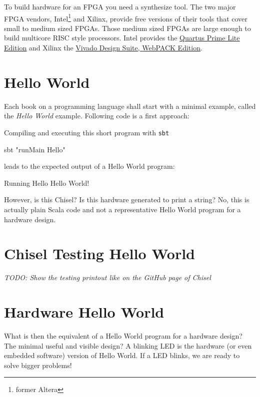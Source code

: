 \documentclass[%
    11pt, %
    headinclude, footexclude,
    openright, %
    notitlepage,
    cleardoubleempty,
    headsepline,
    pointlessnumbers,
    bibtotoc, idxtotoc,
    ]{scrbook}
\newcommand{\code}[1]{{\small{\texttt{#1}}}}
\newcommand{\todo}[1]{{\emph{TODO: #1}}}
\begin{document}
To build hardware for an FPGA you need a synthesize tool. The two major
FPGA vendors, Intel\footnote{former Altera} and Xilinx, provide free versions of
their tools that cover small to medium sized FPGAs. Those medium sized
FPGAs are large enough to build multicore RISC style processors.
Intel provides the \href{https://www.altera.com/products/design-software/fpga-design/quartus-prime/download.html}{Quartus Prime Lite Edition} and Xilinx the
\href{https://www.xilinx.com/products/design-tools/vivado/vivado-webpack.html}{Vivado Design Suite, WebPACK Edition}.

\section{Hello World}

Each book on a programming language shall start with a minimal example,
called the \emph{Hello World} example. Following code is a first approach:





Compiling and executing this short program with \code{sbt}

\begin{chisel}
sbt "runMain Hello"
\end{chisel}

leads to the expected output of a Hello World program:

\begin{chisel}
[info] Running Hello 
Hello World!
\end{chisel}

However, is this Chisel? Is this hardware generated to print a string?
No, this is actually plain Scala code and not a representative Hello World
program for a hardware design.

\section{Chisel Testing Hello World}

\todo{Show the testing printout like on the GitHub page of Chisel}

\section{Hardware Hello World}

What is then the equivalent of a Hello World program for a hardware design?
The minimal useful and visible design? A blinking LED is the hardware (or even
embedded software) version of Hello World. If a LED blinks, we are ready to
solve bigger problems!
\end{document}
